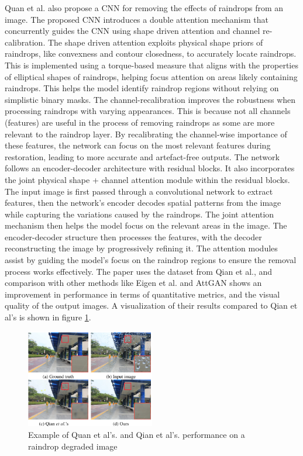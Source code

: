 \documentclass[11pt]{ociamthesis}  %
\begin{document}
Quan et al.\cite{quan2019deep} also propose a CNN for removing the effects of raindrops from an image. The proposed CNN introduces a double attention mechanism that concurrently guides the CNN using shape driven attention and channel re-calibration. The shape driven attention exploits physical shape priors of raindrops, like convexness and contour closedness, to accurately locate raindrops. This is implemented using a torque-based measure\cite{nishigaki2012image} that aligns with the properties of elliptical shapes of raindrops, helping focus attention on areas likely containing raindrops. This helps the model identify raindrop regions without relying on simplistic binary masks. The channel-recalibration improves the robustness when processing raindrops with varying appearances. This is because not all channels (features) are useful in the process of removing raindrops as some are more relevant to the raindrop layer. By recalibrating the channel-wise importance of these features, the network can focus on the most relevant features during restoration, leading to more accurate and artefact-free outputs. The network follows an encoder-decoder architecture with residual blocks. It also incorporates the joint physical shape + channel attention module within the residual blocks. The input image is first passed through a convolutional network to extract features, then the network's encoder decodes spatial patterns from the image while capturing the variations caused by the raindrops. The joint attention mechanism then helps the model focus on the relevant areas in the image. The encoder-decoder structure then processes the features, with the decoder reconstructing the image by progressively refining it. The attention modules assist by guiding the model's focus on the raindrop regions to ensure the removal process works effectively. The paper uses the dataset from Qian et al.\cite{qian2018attentive}, and comparison with other methods like Eigen et al.\cite{eigen2013restoring} and AttGAN\cite{qian2018attentive} shows an improvement in performance in terms of quantitative metrics, and the visual quality of the output images. A visualization of their results compared to Qian et al's is shown in figure \ref{Figure: Quan et al. 2019}. 

\begin{figure}[h]
    \centering
    \includegraphics[width=0.5\textwidth, height = 0.4\textwidth]{figures/Quan et al's results.png}
    \caption{Example of Quan et al's. and Qian et al's. performance on a raindrop degraded image } 
    \label{Figure: Quan et al. 2019}
\end{figure}
\end{document}
